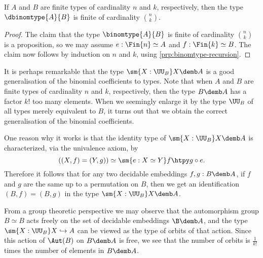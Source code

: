 \begin{thm}
  If $A$ and $B$ are finite types of cardinality $n$ and $k$, respectively, then the type $\dbinomtype{A}{B}$ is finite of cardinality $\binom{n}{k}$.
\end{thm}

\begin{proof}
  The claim that the type $\binomtype{A}{B}$ is finite of cardinality $\binom{n}{k}$ is a proposition, so we may assume $e:\Fin{n}\simeq A$ and $f:\Fin{k}\simeq B$. The claim now follows by induction on $n$ and $k$, using \cref{prp:binomtype-recursion}.
\end{proof}

\begin{rmk}
  It is perhaps remarkable that the type $\sm{X:\UU_B}X\demb A$ is a good generalisation of the binomial coefficients to types. Note that when $A$ and $B$ are finite types of cardinality $n$ and $k$, respectively, then the type $B\demb A$ has a factor $k!$ too many elements. When we seemingly enlarge it by the type $\UU_B$ of all types merely equivalent to $B$, it turns out that we obtain the correct generalisation of the binomial coefficients.

  One reason why it works is that the identity type of $\sm{X:\UU_B}X\demb A$ is characterized, via the univalence axiom, by
  \begin{equation*}
    ((X,f)=(Y,g))\simeq\sm{e:X\simeq Y}f\htpy g\circ e. 
  \end{equation*}
  Therefore it follows that for any two decidable embeddings $f,g:B\demb A$, if $f$ and $g$ are the same up to a permutation on $B$, then we get an identification $(B,f)=(B,g)$ in the type $\sm{X:\UU_B}X\demb A$.

  From a group theoretic perspective we may observe that the automorphism group $B\simeq B$ acts freely on the set of decidable embeddings $\B\demb A$, and the type $\sm{X:\UU_B}X\hookrightarrow A$ can be viewed as the type of orbits of that action. Since this action of $\Aut(B)$ on $B\demb A$ is free, we see that the number of orbits is $\frac{1}{k!}$ times the number of elements in $B\demb A$. 
\end{rmk}

